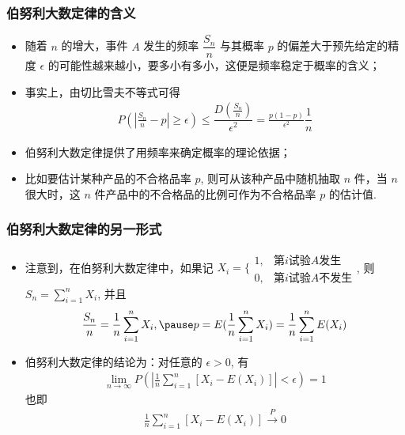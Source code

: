 \documentclass[Prob-All.tex]{subfiles}
\begin{document}
\begin{frame}
	\frametitle{伯努利大数定律的含义}
	\begin{itemize}[<+-|alert@+>]
		\item 随着 $n$ 的增大，事件 $A$ 发生的频率 $\dfrac{S_n}{n}$ 与其概率 $p$ 的偏差大于预先给定的精度 $\epsilon$ 的可能性越来越小，要多小有多小，这便是频率稳定于概率的含义；
		\item 事实上，由切比雪夫不等式可得
		\begin{eqnarray*}
			P(|\frac{S_n}{n}-p|\ge\epsilon)\le \dfrac{D(\frac{S_n}{n})}{\epsilon^2}=\frac{p(1-p)}{\epsilon^2}\dfrac{1}{n}
		\end{eqnarray*}

		\item 伯努利大数定律提供了用频率来确定概率的理论依据；
		\item 比如要估计某种产品的不合格品率 $p$, 则可从该种产品中随机抽取 $n$ 件，当 $n$ 很大时，这 $n$ 件产品中的不合格品的比例可作为不合格品率 $p$ 的估计值.
	\end{itemize}
\end{frame}
\begin{frame}
	\frametitle{伯努利大数定律的另一形式}
	\begin{itemize}[<+-|alert@+>]
		\item 注意到，在伯努利大数定律中，如果记 $X_i=\bigg\{
		\begin{array}{ll}
			1,& \mbox{第} i\mbox{试验} A\mbox{发生}\\
			0,& \mbox{第} i\mbox{试验} A\mbox{不发生}
		\end{array}
		$, 则 $S_n=\sum_{i=1}^nX_i$, 并且
		\begin{eqnarray*}
			\frac{S_n}{n}=\frac{1}{n}\sum_{i=1}^nX_i, \pause p=E(\frac{1}{n}\sum_{i=1}^nX_i)=\frac{1}{n}\sum_{i=1}^nE(X_i)
		\end{eqnarray*}
		\item 伯努利大数定律的结论为：对任意的 $\epsilon>0$, 有
		\begin{eqnarray*}
			\lim_{n\rightarrow\infty}P(|\frac{1}{n}\sum_{i=1}^n[X_i-E(X_i)]|<\epsilon)=1
		\end{eqnarray*}
		也即
		\begin{eqnarray*}
			\frac{1}{n}\sum_{i=1}^n[X_i-E(X_i)]\stackrel{P}{\rightarrow}0
		\end{eqnarray*}

	\end{itemize}

\end{frame}
\end{document}
